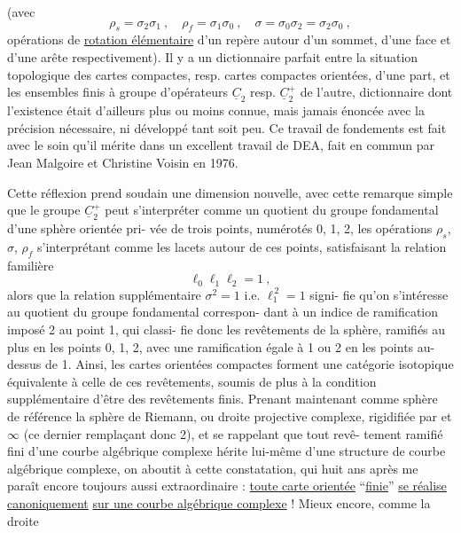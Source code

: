 
(avec
\[ \rho_s = \sigma_2\sigma_1 \ , \quad \rho_f = \sigma_1\sigma_0 \ , \quad \sigma = \sigma_0\sigma_2 = \sigma_2\sigma_0 \ , \]
opérations de \uline{rotation élémentaire} d'un repère autour d'un sommet,
d'une face et d'une arête respectivement). Il y a un dictionnaire
parfait entre la situation topologique des cartes compactes, resp.
cartes compactes orientées, d'une part, et les ensembles finis à
groupe d'opérateurs $\underline{C}_2$ resp. $\underline{C}_2^+$ de l'autre, dictionnaire dont
l'existence était d'ailleurs plus ou moins connue, mais jamais
énoncée avec la précision nécessaire, ni développé tant soit peu.
Ce travail de fondements est fait avec le soin qu'il mérite dans
un excellent travail de DEA, fait en commun par Jean Malgoire et
Christine Voisin en 1976.

Cette réflexion prend soudain une dimension nouvelle,
avec cette remarque simple que le groupe $\underline{C}_2^+$ peut s'interpréter
comme un quotient du groupe fondamental d'une sphère orientée pri-%
vée de trois points, numérotés 0, 1, 2, les opérations $\rho_s$, $\sigma$, $\rho_f$
s'interprétant comme les lacets autour de ces points, satisfaisant
la relation familière
\[ \ell_0\ell_1\ell_2 = 1 \ , \]
alors que la relation supplémentaire $\sigma^2 = 1$ i.e. $\ell_1^{\,2} = 1$ signi-%
fie qu'on s'intéresse au quotient du groupe fondamental correspon-%
dant à un indice de ramification imposé 2 au point 1, qui classi-%
fie donc les revêtements de la sphère, ramifiés au plus en les
points 0, 1, 2, avec une ramification égale à 1 ou 2 en les points
au-dessus de 1. Ainsi, les cartes orientées compactes forment une
catégorie isotopique équivalente à celle de ces revêtements, soumis
de plus à la condition supplémentaire d'être des revêtements finis.
Prenant maintenant comme sphère de référence la sphère de Riemann,
ou droite projective complexe, rigidifiée par 
et $\infty$ (ce dernier remplaçant donc 2), et se rappelant que tout revê-%
tement ramifié fini d'une courbe algébrique complexe hérite lui-même
d'une structure de courbe algébrique complexe, on aboutit à cette
constatation, qui huit ans après me paraît encore toujours aussi
extraordinaire : \uline{toute carte orientée} ``\uline{finie}'' \uline{se réalise canoniquement}
\uline{sur une courbe algébrique complexe} ! Mieux encore, comme la droite


